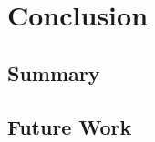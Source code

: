 \chapter{Conclusion}
\label{Conclusion}

\section{Summary}
\label{Summary}

\section{Future Work}
\label{Future Work}

